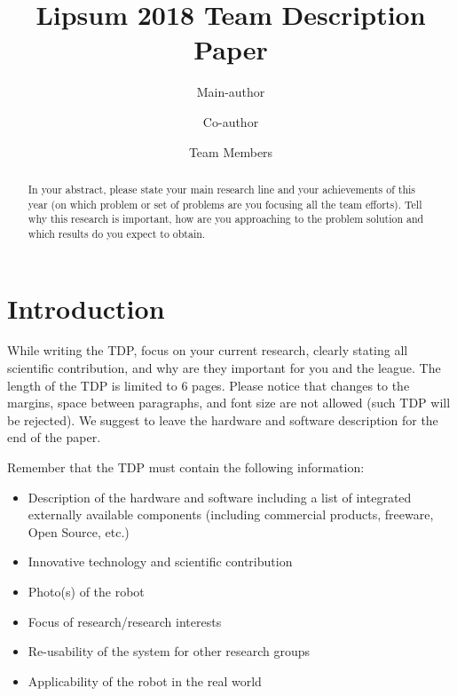 \documentclass[runningheads,a4paper]{llncs}
\title{Lipsum 2018 Team Description Paper}
\author{Main-author \and Co-author \and Team Members}
\institute{Affiliation name and address, \\
\texttt{http://devoted-web-site.url}}
\begin{document}
\maketitle

%
%

\begin{abstract}

In your abstract, please state your main research line and your achievements of this year (on which problem or set of problems are you focusing all the team efforts). Tell why this research is important, how are you approaching to the problem solution and which results do you expect to obtain.

\end{abstract}



\section{Introduction}
While writing the TDP, focus on your current research, clearly stating all scientific contribution, and why are they important for you and the league. The length of the TDP is limited to 6 pages. Please notice that changes to the margins, space between paragraphs, and font size are not allowed (such TDP will be rejected). We suggest to leave the hardware and software description for the end of the paper.

Remember that the TDP must contain the following information:

\begin{itemize}
	\item Description of the hardware and software including a list of integrated externally available components (including commercial products, freeware, Open Source, etc.)
	\item Innovative technology and scientific contribution
	\item Photo(s) of the robot
	\item Focus of research/research interests
	\item Re-usability of the system for other research groups
	\item Applicability of the robot in the real world
\end{itemize}
\end{document}
